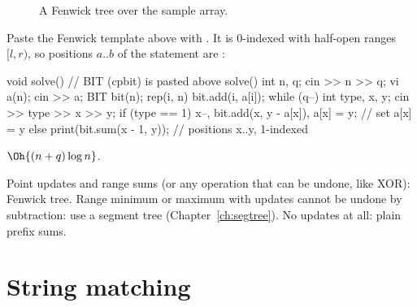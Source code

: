 \begin{figure}[H]
\centering
{}
\caption{A Fenwick tree over the sample array.}
\end{figure}

 Paste the Fenwick template above  with . It is 0-indexed with half-open ranges
$[l, r)$, so positions $a..b$ of the statement are :
\begin{code}
void solve() {  // BIT (cpbit) is pasted above solve()
    int n, q;
    cin >> n >> q;
    vi a(n);
    cin >> a;
    BIT bit(n);
    rep(i, n) bit.add(i, a[i]);
    while (q--) {
        int type, x, y;
        cin >> type >> x >> y;
        if (type == 1) x--, bit.add(x, y - a[x]), a[x] = y;  // set a[x] = y
        else print(bit.sum(x - 1, y));  // positions x..y, 1-indexed
    }
}
\end{code}

 $\Oh{(n + q)\log n}$.

\begin{recognize}
Point updates and range sums (or any operation that can be undone, like XOR): Fenwick tree. Range minimum or maximum with
updates cannot be undone by subtraction: use a segment tree (Chapter~\ref{ch:segtree}). No updates at all: plain prefix sums.
\end{recognize}

\section[String matching]{String matching \hfill \gold}\label{wp:kmp}

